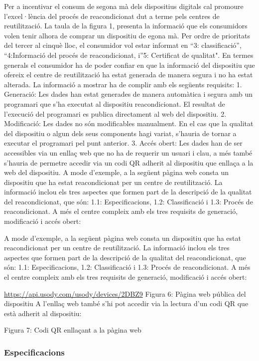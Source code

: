 \documentclass[
]{book}
\begin{document}
Per a incentivar el consum de segona mà dels dispositius digitals cal promoure l'excel·lència del
procés de reacondicionat dut a terme pels centres de reutilització. La taula de la figura 1,
presenta la informació que els consumidors volen tenir alhora de comprar un dispositiu de egona mà. Per ordre de prioritats del tercer al cinquè lloc, el consumidor vol estar informat en
``3: classificació'', ``4:Informació del procés de reacondicionat, i''5: Certificat de qualitat".
En termes generals el consumidor ha de poder confiar en que la informació del dispositiu que
ofereix el centre de reutilització ha estat generada de manera segura i no ha estat alterada. La
informació a mostrar ha de complir amb els següents requisits:
1. Generació: Les dades han estat generades de manera automàtica i segura amb un
programari que s'ha executat al dispositiu reacondicionat. El resultat de l'execució del
programari es publica directament al web del dispositiu.
2. Modificació: Les dades no són modificables manualment. En el cas que la qualitat del
dispositiu o algun dels seus components hagi variat, s'hauria de tornar a executar el
programari pel punt anterior.
3. Accés obert: Les dades han de ser accessibles via un enllaç web que no ha de requerir
un usuari i clau, a més també s'hauria de permetre accedir via un codi QR adherit al
dispositiu que enllaça a la web del dispositiu.
A mode d'exemple, a la següent pàgina web consta un dispositiu que ha estat reacondicionat
per un centre de reutilització. La informació inclou els tres aspectes que formen part de la
descripció de la qualitat del reacondicionat, que són: 1.1: Especificacions, 1.2: Classificació i
1.3: Procés de reacondicionat. A més el centre compleix amb els tres requisits de generació,
modificació i accés obert:

A mode d'exemple, a la següent pàgina web consta un dispositiu que ha estat reacondicionat
per un centre de reutilització. La informació inclou els tres aspectes que formen part de la
descripció de la qualitat del reacondicionat, que són: 1.1: Especificacions, 1.2: Classificació i
1.3: Procés de reacondicionat. A més el centre compleix amb els tres requisits de generació,
modificació i accés obert:

\url{https://api.usody.com/usody/devices/2DBZ9}
Figura 6: Pàgina web pública del dispositiu
A l'enllaç web també s'hi pot accedir via la lectura d'un codi QR que està adherit al dispositiu:

Figura 7: Codi QR enllaçant a la pàgina web

\hypertarget{especificacions}{%
\subsubsection{Especificacions}\label{especificacions}}
\end{document}
